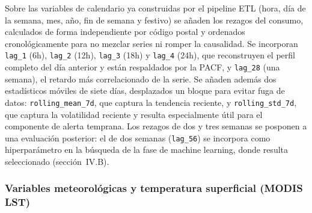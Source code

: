 \documentclass[12pt, a4paper]{article}
\begin{document}
Sobre las variables de calendario ya construidas por el pipeline ETL (hora, día de la semana, mes, año, fin de semana y festivo) se añaden los rezagos del consumo, calculados de forma independiente por código postal y ordenados cronológicamente para no mezclar series ni romper la causalidad. Se incorporan \texttt{lag\_1} (6h), \texttt{lag\_2} (12h), \texttt{lag\_3} (18h) y \texttt{lag\_4} (24h), que reconstruyen el perfil completo del día anterior y están respaldados por la PACF, y \texttt{lag\_28} (una semana), el retardo más correlacionado de la serie. Se añaden además dos estadísticos móviles de siete días, desplazados un bloque para evitar fuga de datos: \texttt{rolling\_mean\_7d}, que captura la tendencia reciente, y \texttt{rolling\_std\_7d}, que captura la volatilidad reciente y resulta especialmente útil para el componente de alerta temprana. Los rezagos de dos y tres semanas se posponen a una evaluación posterior: el de dos semanas (\texttt{lag\_56}) se incorpora como hiperparámetro en la búsqueda de la fase de machine learning, donde resulta seleccionado (sección~IV.B).

\subsubsection{Variables meteorológicas y temperatura superficial (MODIS LST)}
\end{document}

